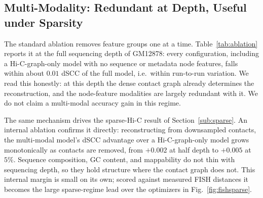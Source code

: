 \documentclass[conference]{IEEEtran}
\begin{document}
\begin{table}[t]
\caption{Cross-cell-line generalization on chromosome~22. A GM12878-trained
GenoFold is transferred without retraining; ``retrained'' re-fits the target cell
line from scratch as an upper bound.}
\label{tab:crosscell}
\centering

\end{table}

\subsection{Multi-Modality: Redundant at Depth, Useful under Sparsity}
The standard ablation removes feature groups one at a time.
Table~\ref{tab:ablation} reports it at the full sequencing depth of GM12878: every
configuration, including a Hi-C-graph-only model with no sequence or metadata node
features, falls within about $0.01$ dSCC of the full model, i.e.\ within run-to-run
variation. We read this honestly: at this depth the dense contact graph already
determines the reconstruction, and the node-feature modalities are largely redundant
with it. We do not claim a multi-modal accuracy gain in this regime.

The same mechanism drives the sparse-Hi-C result of Section~\ref{sub:sparse}. An
internal ablation confirms it directly: reconstructing from downsampled contacts, the
multi-modal model's dSCC advantage over a Hi-C-graph-only model grows monotonically as
contacts are removed, from $+0.002$ at half depth to $+0.005$ at $5\%$. Sequence
composition, GC content, and mappability do not thin with sequencing depth, so they hold
structure where the contact graph does not. This internal margin is small on its own;
scored against measured FISH distances it becomes the large sparse-regime lead over the
optimizers in Fig.~\ref{fig:fishsparse}.

\begin{table}[t]
\caption{Modality ablation on GM12878 chromosome~22 at full depth (held-out dSCC).
All configurations, including Hi-C-graph-only, lie within $\sim$0.01 dSCC:
the dense contact graph dominates and the node modalities are near-redundant here.
``sparse'' restricts to pairs touching the low-coverage tercile of bins.}
\label{tab:ablation}
\centering

\end{table}
\end{document}
